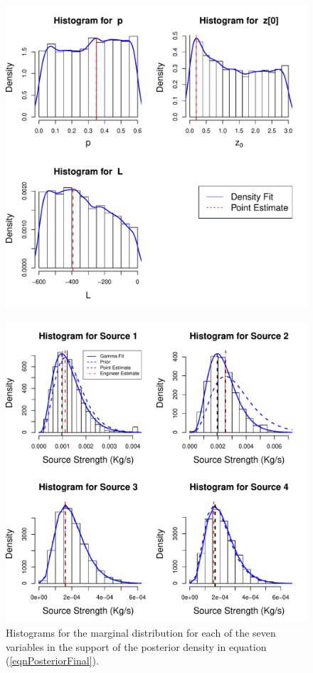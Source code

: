 \documentclass[12pt]{book}
\begin{document}
\begin{figure}[H]
\centering
\includegraphics[scale=0.5]{./FigChap4/histogramsI}
\label{figHistograms}
\end{figure}
\begin{figure}[H]
\centering
\includegraphics[scale=0.5]{./FigChap4/histogramsII}
\caption{Histograms for the marginal distribution for each of the seven variables
in the support of the posterior density in equation (\ref{eqnPosteriorFinal}).}
\label{figHistograms}
\end{figure}
\end{document}
